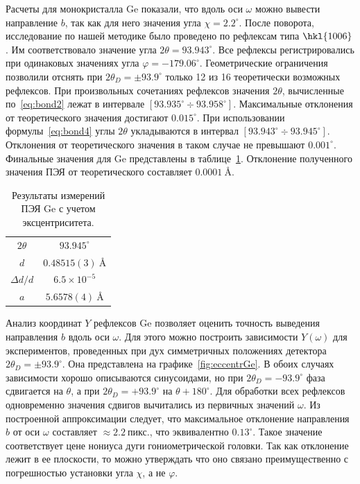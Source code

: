 \documentclass[a4paper,14pt]{extarticle}
\newcommand{\unit}[1]{ \ \text{#1}}
\newcommand{\degree}{^\circ}
\newcommand{\range}[2]{[#1\div#2]}
\begin{document}
Расчеты для монокристалла Ge показали, что вдоль оси $\omega$ можно вывести направление $b$, так как для него значения угла $\chi = 2.2\degree$.
После поворота, исследование по нашей методике было проведено по рефлексам типа $\hkl{10 0 6}$.
Им соответствовало значение угла $2\theta = 93.943\degree$.
Все рефлексы регистрировались при одинаковых значениях угла $\varphi = -179.06\degree$.
Геометрические ограничения позволили отснять при $2\theta_D = \pm 93.9\degree$ только 12 из 16 теоретически возможных рефлексов.
При произвольных сочетаниях рефлексов значения $2\theta$, вычисленные по~\ref{eq:bond2} лежат в интервале $\range{93.935\degree}{93.958\degree}$.
Максимальные отклонения от теоретического значения достигают $0.015\degree$.
При использовании формулы~\ref{eq:bond4} углы $2\theta$ укладываются в интервал $\range{93.943\degree}{93.945\degree}$.
Отклонения от теоретического значения в таком случае не превышают $0.001\degree$.
Финальные значения для Ge представлены в таблице~\ref{tab:Ge:eccentr}.
Отклонение полученного значения ПЭЯ от теоретического составляет $0.0001\unit{\AA}$.
\begin{table}[ht!]
    \centering
    \begin{tabular}{ |c|c| }
        \hline
        $2\theta$ & $93.945\degree$ \\
        $d$ & $0.48515 (3)\unit{\AA}$ \\
        $\Delta d / d$ & $6.5 \times 10^{-5}$ \\
        $a$ & $5.6578 (4)\unit{\AA}$ \\
        \hline
    \end{tabular}
    \caption{Результаты измерений ПЭЯ Ge с учетом эксцентриситета.}
    \label{tab:Ge:eccentr}
\end{table}

Анализ координат $Y$ рефлексов Ge позволяет оценить точность выведения направления $b$ вдоль оси $\omega$.
Для этого можно построить зависимости $Y(\omega)$ для экспериментов, проведенных при дух симметричных положениях детектора $2\theta_D = \pm 93.9\degree$.
Она представлена на графике~\ref{fig:eccentrGe}.
В обоих случаях зависимости хорошо описываются синусоидами, но при $2\theta_D = -93.9\degree$ фаза сдвигается на $\theta$, а при $2\theta_D = +93.9\degree$ на $\theta + 180\degree$.
Для обработки всех рефлексов одновременно значения сдвигов вычитались из первичных значений $\omega$.
Из построенной аппроксимации следует, что максимальное отклонение направления $b$ от оси $\omega$ составляет $\approx 2.2\unit{пикс.}$, что эквивалентно $0.13\degree$.
Такое значение соответствует цене нониуса дуги гониометрической головки.
Так как отклонение лежит в ее плоскости, то можно утверждать что оно связано преимущественно с погрешностью установки угла $\chi$, а не $\varphi$.
\end{document}
